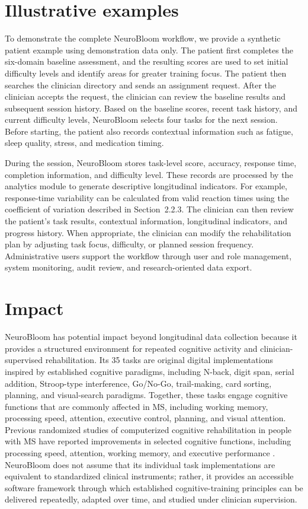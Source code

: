 \documentclass[preprint,12pt,a4paper]{elsarticle}
\begin{document}
\section{Illustrative examples}

To demonstrate the complete NeuroBloom workflow, we provide a synthetic
patient example using demonstration data only. The patient first completes
the six-domain baseline assessment, and the resulting scores are used to set
initial difficulty levels and identify areas for greater training focus. The
patient then searches the clinician directory and sends an assignment
request. After the clinician accepts the request, the clinician can review
the baseline results and subsequent session history. Based on the baseline
scores, recent task history, and current difficulty levels, NeuroBloom
selects four tasks for the next session. Before starting, the patient also
records contextual information such as fatigue, sleep quality, stress, and
medication timing.

During the session, NeuroBloom stores task-level score, accuracy, response
time, completion information, and difficulty level. These records are
processed by the analytics module to generate descriptive longitudinal
indicators. For example, response-time variability can be calculated from
valid reaction times using the coefficient of variation described in
Section~2.2.3. The clinician can then review the patient's task results,
contextual information, longitudinal indicators, and progress history. When
appropriate, the clinician can modify the rehabilitation plan by adjusting
task focus, difficulty, or planned session frequency. Administrative users
support the workflow through user and role management, system monitoring,
audit review, and research-oriented data export.

\section{Impact}


NeuroBloom has potential impact beyond longitudinal data collection because
it provides a structured environment for repeated cognitive activity and
clinician-supervised rehabilitation. Its 35 tasks are original digital
implementations inspired by established cognitive paradigms, including
N-back, digit span, serial addition, Stroop-type interference, Go/No-Go,
trail-making, card sorting, planning, and visual-search paradigms. Together,
these tasks engage cognitive functions that are commonly affected in MS,
including working memory, processing speed, attention, executive control,
planning, and visual attention. Previous randomized studies of computerized
cognitive rehabilitation in people with MS have reported improvements in
selected cognitive functions, including processing speed, attention,
working memory, and executive performance
\cite{hancock2015,chiaravalloti2022,naeeni2022}. NeuroBloom does not assume
that its individual task implementations are equivalent to standardized
clinical instruments; rather, it provides an accessible software framework
through which established cognitive-training principles can be delivered
repeatedly, adapted over time, and studied under clinician supervision.
\end{document}

